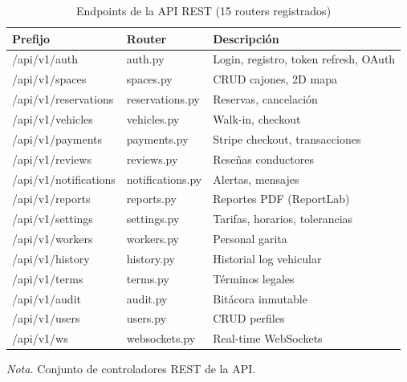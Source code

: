 \begin{table}[htbp]
\caption{Endpoints de la API REST (15 routers registrados)}
\label{tab:endpoints_api}
\begin{tabular}{@{}p{3.5cm} p{3.5cm} p{8cm}@{}}
\toprule
\textbf{Prefijo} & \textbf{Router} & \textbf{Descripción} \\
\midrule
/api/v1/auth & auth.py & Login, registro, token refresh, OAuth \\
/api/v1/spaces & spaces.py & CRUD cajones, 2D mapa \\
/api/v1/reservations & reservations.py & Reservas, cancelación \\
/api/v1/vehicles & vehicles.py & Walk-in, checkout \\
/api/v1/payments & payments.py & Stripe checkout, transacciones \\
/api/v1/reviews & reviews.py & Reseñas conductores \\
/api/v1/notifications & notifications.py & Alertas, mensajes \\
/api/v1/reports & reports.py & Reportes PDF (ReportLab) \\
/api/v1/settings & settings.py & Tarifas, horarios, tolerancias \\
/api/v1/workers & workers.py & Personal garita \\
/api/v1/history & history.py & Historial log vehicular \\
/api/v1/terms & terms.py & Términos legales \\
/api/v1/audit & audit.py & Bitácora inmutable \\
/api/v1/users & users.py & CRUD perfiles \\
/api/v1/ws & websockets.py & Real-time WebSockets \\
\bottomrule
\end{tabular}
\par\vspace{0.2cm}
\textit{Nota.} Conjunto de controladores REST de la API.
\end{table}

